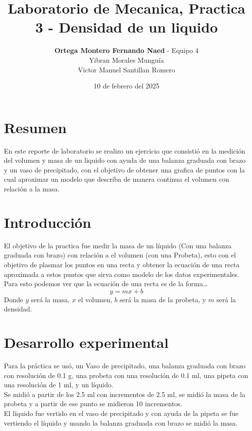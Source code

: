 \documentclass[12pt,a4paper]{article}
\begin{document}
\title{Laboratorio de Mecanica, Practica 3 - Densidad de un liquido}
\date{10 de febrero del 2025}
\author{\textbf{Ortega Montero Fernando Naed} - Equipo 4\\
Yibran Morales Munguía\\
Victor Manuel Santillan Romero}
\maketitle
\section{Resumen} 

En este reporte de laboratorio se realizo un ejercicio que consistió en la medición del volumen y masa de un liquido con ayuda de una balanza graduada con brazo y un vaso de precipitado, con el objetivo de obtener una grafica de puntos con la cual aproximar un modelo que describa de manera continua el volumen con relación a la masa.

\section{Introducción}

El objetivo de la practica fue medir la masa de un líquido (Con una balanza graduada con brazo) con relación a el volumen (con una Probeta), esto con el objetivo de plasmar los puntos en una recta y obtener la ecuación de una recta aproximada a estos puntos que sirva como modelo de los datos experimentales.\\
Para esto podemos ver que la ecuación de una recta es de la forma…
\[y = mx+ b\]
Donde $y$ será la masa, $x$ el volumen, $b$ será la masa de la probeta, y $m$ será la densidad.


\section{Desarrollo experimental}

Para la práctica se usó, un Vaso de precipitado, una balanza graduada con brazo con resolución de 0.1 g, una probeta con una resolución de 0.1 ml, una pipeta con una resolución de 1 ml, y un líquido. \\
Se midió a partir de los 2.5 ml con incrementos de 2.5 ml, se midió la masa de la probeta y a partir de ese punto se midieron 10 incrementos. \\

El líquido fue vertido en el vaso de precipitado y con ayuda de la pipeta se fue vertiendo el líquido y usando la balanza graduada con brazo se midió la masa.
\end{document}
